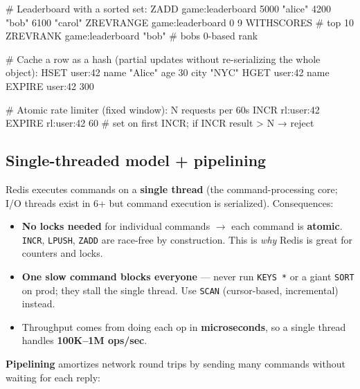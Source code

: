 \documentclass[11pt]{article}
\providecommand{\tightlist}{\setlength{\itemsep}{1pt}\setlength{\parskip}{0pt}}
\newenvironment{Shaded}{\begin{snugshade}}{\end{snugshade}}
\newcommand{\NormalTok}[1]{\textcolor[rgb]{0.81,0.81,0.76}{#1}}
\begin{document}

\begin{Shaded}
\begin{Highlighting}[]
\NormalTok{\# Leaderboard with a sorted set:}
\NormalTok{ZADD game:leaderboard 5000 "alice" 4200 "bob" 6100 "carol"}
\NormalTok{ZREVRANGE game:leaderboard 0 9 WITHSCORES     \# top 10}
\NormalTok{ZREVRANK game:leaderboard "bob"                \# bob\textquotesingle{}s 0{-}based rank}

\NormalTok{\# Cache a row as a hash (partial updates without re{-}serializing the whole object):}
\NormalTok{HSET user:42 name "Alice" age 30 city "NYC"}
\NormalTok{HGET user:42 name}
\NormalTok{EXPIRE user:42 300}

\NormalTok{\# Atomic rate limiter (fixed window): N requests per 60s}
\NormalTok{INCR rl:user:42}
\NormalTok{EXPIRE rl:user:42 60     \# set on first INCR; if INCR result \textgreater{} N → reject}
\end{Highlighting}
\end{Shaded}

\subsection{Single-threaded model + pipelining}\label{single-threaded-model--pipelining}

Redis executes commands on a \textbf{single thread} (the command-processing core; I/O threads exist in 6+ but command execution is serialized). Consequences:

\begin{itemize}
\tightlist
\item
  \textbf{No locks needed} for individual commands \(\rightarrow\) each command is \textbf{atomic}. \texttt{INCR}, \texttt{LPUSH}, \texttt{ZADD} are race-free by construction. This is \emph{why} Redis is great for counters and locks.
\item
  \textbf{One slow command blocks everyone} --- never run \texttt{KEYS\ *} or a giant \texttt{SORT} on prod; they stall the single thread. Use \texttt{SCAN} (cursor-based, incremental) instead.
\item
  Throughput comes from doing each op in \textbf{microseconds}, so a single thread handles \textbf{100K--1M ops/sec}.
\end{itemize}

\textbf{Pipelining} amortizes network round trips by sending many commands without waiting for each reply:

\end{document}
